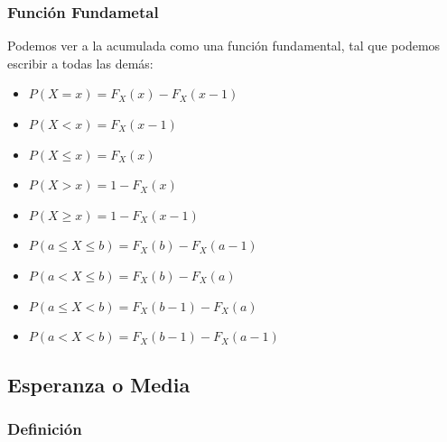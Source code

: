 \documentclass[12pt, fleqn]{report}                             %
\theoremstyle{break}                                            %
\begin{document}
                \subsubsection{Función Fundametal}

                    Podemos ver a la acumulada como una función fundamental, tal que
                    podemos escribir a todas las demás:
                    \begin{itemize}
                        \item $P(X = x)             = F_X(x) - F_X(x - 1)$
                        \item $P(X < x)             = F_X(x - 1)$
                        \item $P(X \leq x)          = F_X(x)$
                        \item $P(X > x)             = 1 - F_X(x)$
                        \item $P(X \geq x)          = 1 - F_X(x - 1)$
                        \item $P(a \leq X \leq b)   = F_X(b) - F_X(a - 1)$
                        \item $P(a < X \leq b)      = F_X(b) - F_X(a)$
                        \item $P(a \leq X < b)      = F_X(b - 1) - F_X(a)$
                        \item $P(a < X < b)         = F_X(b - 1) - F_X(a - 1)$
                    \end{itemize}
                    


            \clearpage
            \subsection{Esperanza o Media}

                \subsubsection{Definición}
\end{document}
